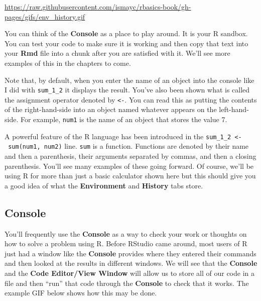 \documentclass[]{tufte-book}
\theoremstyle{definition}
\theoremstyle{definition}
\theoremstyle{remark}
\begin{document}
\vspace{0.1in}

\begin{center}\footnotesize{\url{https://raw.githubusercontent.com/ismayc/rbasics-book/gh-pages/gifs/env_history.gif}}\end{center}

\vspace{0.1in}

You can think of the \textbf{Console} as a place to play around. It is
your R sandbox. You can test your code to make sure it is working and
then copy that text into your \textbf{Rmd} file into a chunk after you
are satisfied with it. We'll see more examples of this in the chapters
to come.

Note that, by default, when you enter the name of an object into the
console like I did with \texttt{sum\_1\_2} it displays the result.
You've also been shown what is called the assignment operator denoted by
\texttt{\textless{}-}. You can read this as putting the contents of the
right-hand-side into an object named whatever appears on the
left-hand-side. For example, \texttt{num1} is the name of an object that
stores the value 7.

A powerful feature of the R language has been introduced in the
\texttt{sum\_1\_2\ \textless{}-\ sum(num1,\ num2)} line. \texttt{sum} is
a function. Functions are denoted by their name and then a parenthesis,
their arguments separated by commas, and then a closing parenthesis.
You'll see many examples of these going forward. Of course, we'll be
using R for more than just a basic calculator shown here but this should
give you a good idea of what the \textbf{Environment} and
\textbf{History} tabs store.

\subsection{Console}\label{console}

You'll frequently use the \textbf{Console} as a way to check your work
or thoughts on how to solve a problem using R. Before RStudio came
around, most users of R just had a window like the \textbf{Console}
provides where they entered their commands and then looked at the
results in different windows. We will see that the \textbf{Console} and
the \textbf{Code Editor/View Window} will allow us to store all of our
code in a file and then ``run'' that code through the \textbf{Console}
to check that it works. The example GIF below shows how this may be
done.
\end{document}
